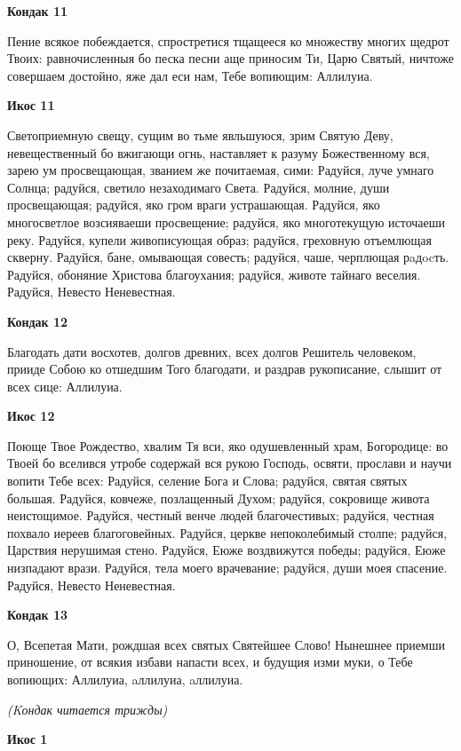 \bfseries Кондак 11\normalfont{}


Пение всякое побеждается, спростретися тщащееся ко множеству многих щедрот Твоих: равночисленныя бо песка песни аще приносим Ти, Царю Святый, ничтоже совершаем достойно, яже дал еси нам, Тебе вопиющим: Аллилуиа.


\bfseries Икос 11\normalfont{}


Светоприемную свещу, сущим во тьме явльшуюся, зрим Святую Деву, невещественный бо вжигающи огнь, наставляет к разуму Божественному вся, зарею ум просвещающая, званием же почитаемая, сими: Радуйся, луче умнаго Солнца; радуйся, светило незаходимаго Света. Радуйся, молние, души просвещающая; радуйся, яко гром враги устрашающая. Радуйся, яко многосветлое возсияваеши просвещение; радуйся, яко многотекущую источаеши реку. Радуйся, купели живописующая образ; радуйся, греховную отъемлющая скверну. Радуйся, бане, омывающая совесть; радуйся, чаше, черплющая рaдocть. Радуйся, обоняние Христова благоухания; радуйся, животе тайнаго веселия. Радуйся, Невесто Неневестная.


\bfseries Кондак 12\normalfont{}


Благодать дати восхотев, долгов древних, всех долгов Решитель человеком, прииде Собою ко отшедшим Того благодати, и раздрав рукописание, слышит от всех сице: Аллилуиа.


\bfseries Икос 12\normalfont{}


Поюще Твое Рождество, хвалим Тя вси, яко одушевленный храм, Богородице: во Твоей бо вселився утробе содержай вся рукою Господь, освяти, прослави и научи вопити Тебе всех: Радуйся, селение Бога и Слова; радуйся, святая святых большая. Радуйся, ковчеже, позлащенный Духом; радуйся, сокровище живота неистощимое. Радуйся, честный венче людей благочестивых; радуйся, честная похвало иереев благоговейных. Радуйся, церкве непоколебимый столпе; радуйся, Царствия нерушимая стено. Радуйся, Еюже воздвижутся победы; радуйся, Еюже низпадают врази. Радуйся, тела моего врачевание; радуйся, души моея спасение. Радуйся, Невесто Неневестная.


\bfseries Кондак 13\normalfont{}


О, Всепетая Мати, рождшая всех святых Святейшее Слово! Нынешнее приемши приношение, от всякия избави напасти всех, и будущия изми муки, о Тебе вопиющих: Аллилуиа, aллилуиа, aллилуиа.


\itshape (Kондак читается трижды)\normalfont{}


\bfseries Икос 1\normalfont{}


